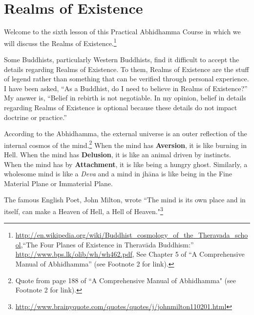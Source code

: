 \section{Realms of Existence}

Welcome to the sixth lesson of this Practical Abhidhamma Course in which we will discuss the Realms of Existence.\footnote{\url{http://en.wikipedia.org/wiki/Buddhist_cosmology_of_the_Theravada_school},\linebreak “The Four Planes of Existence in Theravāda Buddhism:” \url{http://www.bps.lk/olib/wh/wh462.pdf}, See Chapter 5 of “A Comprehensive Manual of Abhidhamma” (see Footnote 2 for link).}

Some Buddhists, particularly Western Buddhists, find it difficult to accept the details regarding Realms of Existence.  To them, Realms of Existence are the stuff of legend rather than something that can be verified through personal experience. I have been asked, “As a Buddhist, do I need to believe in Realms of Existence?” My answer is, “Belief in rebirth is not negotiable. In my opinion, belief in details regarding Realms of Existence is optional because these details do not impact doctrine or practice.”

According to the Abhidhamma, the external universe is an outer reflection of the internal cosmos of the mind.\footnote{Quote from page 188 of “A Comprehensive Manual of Abhidhamma" (see Footnote 2 for link).} When the mind has \textbf{Aversion}, it is like burning in Hell. When the mind has \textbf{Delusion}, it is like an animal driven by instincts. When the mind has by \textbf{Attachment}, it is like being a hungry ghost. Similarly, a wholesome mind is like a \textit{Deva} and a mind in jhāna is like being in the Fine Material Plane or Immaterial Plane.

The famous English Poet, John Milton, wrote ``The mind is its own place and in itself, can make a Heaven of Hell, a Hell of Heaven."\footnote{\url{http://www.brainyquote.com/quotes/quotes/j/johnmilton110201.html}}

